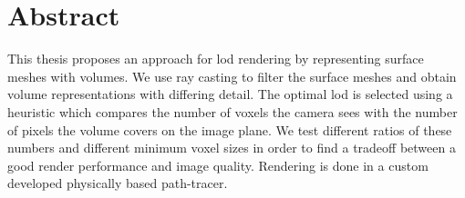 \chapter*{Abstract}
This thesis proposes an approach for \acf{lod} rendering by representing surface meshes with volumes.
We use ray casting to filter the surface meshes and obtain volume representations with differing detail.
The optimal \ac{lod} is selected using a heuristic which compares the number of voxels the camera sees with the number of pixels the volume covers on the image plane.
We test different ratios of these numbers and different minimum voxel sizes in order to find a tradeoff between a good render performance and image quality.
Rendering is done in a custom developed physically based path-tracer.